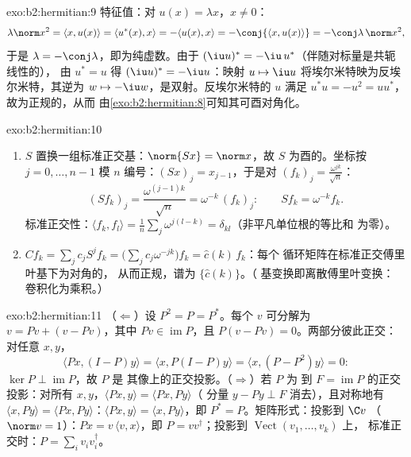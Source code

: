\begin{solution}{exo:b2:hermitian:9}
特征值：对 $u(x) = \lambda x$，$x \neq 0$：
\[
\lambda\norm x^2 = \langle x, u(x)\rangle
= \langle u^*(x), x\rangle = -\langle u(x), x\rangle
= -\conj{\langle x, u(x)\rangle} = -\conj\lambda\,\norm x^2 ,
\]
于是 $\lambda = -\conj\lambda$，即为纯虚数。由于 $(\iu
u)^* = -\iu\,u^*$（伴随对标量是共轭线性的），
由 $u^* = u$ 得 $(\iu u)^* = -\iu u$：映射 $u \mapsto \iu u$
将埃尔米特映为反埃尔米特，其逆为 $w \mapsto -\iu
w$，是双射。反埃尔米特的 $u$ 满足 $u^*u = -u^2 =
uu^*$，故为正规的，从而
由\cref{exo:b2:hermitian:8}可知其可酉对角化。
\end{solution}

\begin{solution}{exo:b2:hermitian:10}
\begin{enumerate}
  \item $S$ 置换一组标准正交基：$\norm{Sx} = \norm
        x$，故 $S$ 为酉的。坐标按 $j = 0,
        \dots, n-1$ 模 $n$ 编号：$(Sx)_j = x_{j-1}$，于是对
        $(f_k)_j = \frac{\omega^{jk}}{\sqrt n}$：
        \[
        (Sf_k)_j = \frac{\omega^{(j-1)k}}{\sqrt n}
        = \omega^{-k}\,(f_k)_j :
        \qquad Sf_k = \omega^{-k}f_k .
        \]
        标准正交性：$\langle f_k, f_l\rangle = \frac1n
        \sum_j \omega^{j(l-k)} = \delta_{kl}$（非平凡单位根的等比和
        为零）。
  \item $Cf_k = \sum_j c_j S^jf_k = \bigl(\sum_j
        c_j\omega^{-jk}\bigr)f_k = \widehat c(k)\,f_k$：每个
        循环矩阵在标准正交傅里叶基下为对角的，
        从而正规，谱为 $\{\widehat c(k)\}$。（
        基变换即离散傅里叶变换：
        卷积化为乘积。）
\end{enumerate}
\end{solution}

\begin{solution}{exo:b2:hermitian:11}
（$\Leftarrow$）设 $P^2 = P = P^*$。每个 $v$ 可分解为 $v = Pv
+ (v - Pv)$，其中 $Pv \in \operatorname{im} P$，且 $P(v - Pv) =
0$。两部分彼此正交：对任意 $x, y$，
\[
\langle Px, (I - P)y\rangle = \langle x, P(I-P)y\rangle
= \langle x, (P - P^2)y\rangle = 0 :
\]
$\ker P \perp \operatorname{im} P$，故 $P$ 是
其像上的正交投影。（$\Rightarrow$）若 $P$ 为
到 $F = \operatorname{im}P$ 的正交投影：对所有
$x, y$，$\langle Px, y\rangle = \langle Px, Py\rangle$（
分量 $y - Py \perp F$ 消去），且对称地有 $\langle
x, Py\rangle = \langle Px, Py\rangle$：$\langle Px, y\rangle =
\langle x, Py\rangle$，即 $P^* = P$。矩阵形式：投影到 $\C v$
（$\norm v = 1$）：$Px = v\,\langle v, x\rangle$，即 $P =
vv^\dagger$；投影到 $\operatorname{Vect}(v_1, \dots, v_k)$ 上，
标准正交时：$P = \sum_i v_iv_i^\dagger$。
\end{solution}

